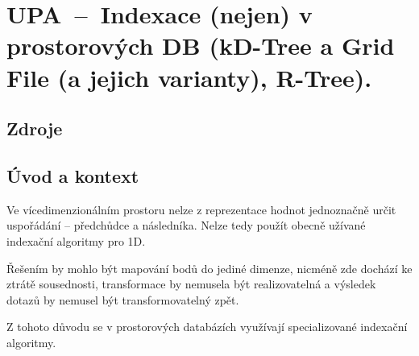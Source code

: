 

\graphicspath{{upa/prostorove_db_indexace/figures}}


\chapter{UPA~--~Indexace (nejen) v prostorových DB (kD-Tree a Grid File (a jejich varianty), R-Tree).}


\section{Zdroje}

\begin{compactitem}
    \item {}
    \item {}
    \item {}
    \item {}
\end{compactitem}


\section{Úvod a kontext}

\begin{compactitem}
    \item Ve vícedimenzionálním prostoru nelze z reprezentace hodnot jednoznačně určit uspořádání -- předchůdce a následníka. Nelze tedy použít obecně užívané indexační algoritmy pro 1D.

    \item Řešením by mohlo být mapování bodů do jediné dimenze, nicméně zde dochází ke ztrátě sousednosti, transformace by nemusela být realizovatelná a výsledek dotazů by nemusel být transformovatelný zpět.

    \item Z tohoto důvodu se v prostorových databázích využívají specializované indexační algoritmy.
\end{compactitem}


